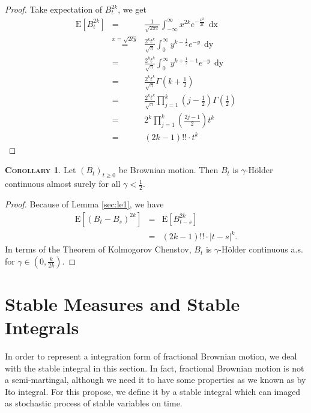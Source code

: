 \documentclass[a4paper, twoside, 11pt]{article}
\theoremstyle{definition}
\newtheorem{corollary}[definition]{\scshape Corollary}
\begin{document}
\begin{proof}
  Take expectation of $B_t^{2k}$, we get
  \begin{eqnarray*}
	\mathrm{E}[B_t^{2k}] &=& \frac{1}{\sqrt{2\pi t}}\int_{-\infty}^{\infty} x^{2k} e^{-\frac{x^2}{2t}}\,\mathop{dx}\\
	&\overset{x=\sqrt{2ty}}{=}& \frac{2^kt^k}{\sqrt{\pi}} \int_0^{\infty} y^{k-\frac{1}{2}} e^{-y}\,\mathop{dy}\\
	&=& \frac{2^kt^k}{\sqrt{\pi}} \int_0^{\infty} y^{k+\frac{1}{2}-1} e^{-y}\,\mathop{dy}\\
	&=& \frac{2^kt^k}{\sqrt{\pi}} \Gamma(k + \frac{1}{2})\\
	&=& \frac{2^kt^k}{\sqrt{\pi}} \prod_{j=1}^k(j-\frac{1}{2}) \Gamma(\frac{1}{2})\\
	&=& 2^k \prod_{j=1}^k(\frac{2j-1}{2}) t^k\\
	&=& (2k - 1)!!\cdot t^k
  \end{eqnarray*}
\end{proof}

\begin{corollary}
  Let $(B_t)_{t\ge 0}$ be Brownian motion. Then $B_t$ is $\gamma$-H\"older continuous almost surely for all $\gamma < \frac{1}{2}$.
\end{corollary}

\begin{proof}
  Because of Lemma \ref{sec:le1}, we have
  \begin{eqnarray*}
	\mathrm{E}[(B_t-B_s)^{2k}] &=& \mathrm{E}[B_{t-s}^{2k}]\\
	&=& (2k - 1)!! \cdot |t-s|^{k}.
  \end{eqnarray*}
  In terms of the Theorem of Kolmogorov Chenstov, $B_t$ is $\gamma$-H\"older continuous a.s. for $\gamma \in (0, \frac{k}{2k})$.
\end{proof}

\newpage

\section{Stable Measures and Stable Integrals}
In order to represent a integration form of fractional Brownian motion, we deal with the stable integral in this section. In fact, fractional Brownian motion is not a semi-martingal, although we need it to have some properties as we known as by Ito integral. For this propose, we define it by a 
stable integral which can imaged as stochastic process of stable variables on time.
\end{document}
